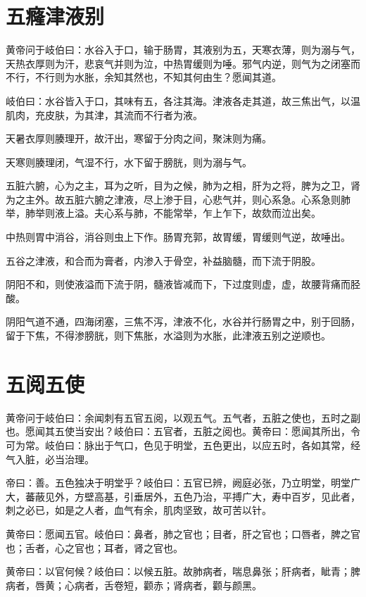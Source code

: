 \documentclass[a4paper,12pt,UTF8,twoside]{ctexbook}
\begin{document}
	\chapter{五癃津液别}
	
	黄帝问于岐伯曰：水谷入于口，输于肠胃，其液别为五，天寒衣薄，则为溺与气，天热衣厚则为汗，悲哀气并则为泣，中热胃缓则为唾。邪气内逆，则气为之闭塞而不行，不行则为水胀，余知其然也，不知其何由生？愿闻其道。
	
	岐伯曰：水谷皆入于口，其味有五，各注其海。津液各走其道，故三焦出气，以温肌肉，充皮肤，为其津，其流而不行者为液。
	
	天暑衣厚则腠理开，故汗出，寒留于分肉之间，聚沫则为痛。
	
	天寒则腠理闭，气湿不行，水下留于膀胱，则为溺与气。
	
	五脏六腑，心为之主，耳为之听，目为之候，肺为之相，肝为之将，脾为之卫，肾为之主外。故五脏六腑之津液，尽上渗于目，心悲气并，则心系急。心系急则肺举，肺举则液上溢。夫心系与肺，不能常举，乍上乍下，故欬而泣出矣。
	
	中热则胃中消谷，消谷则虫上下作。肠胃充郭，故胃缓，胃缓则气逆，故唾出。
	
	五谷之津液，和合而为膏者，内渗入于骨空，补益脑髓，而下流于阴股。
	
	阴阳不和，则使液溢而下流于阴，髓液皆减而下，下过度则虚，虚，故腰背痛而胫酸。
	
	阴阳气道不通，四海闭塞，三焦不泻，津液不化，水谷并行肠胃之中，别于回肠，留于下焦，不得渗膀胱，则下焦胀，水溢则为水胀，此津液五别之逆顺也。
	\chapter{五阅五使}
	
	黄帝问于岐伯曰：余闻刺有五官五阅，以观五气。五气者，五脏之使也，五时之副也。愿闻其五使当安出？岐伯曰：五官者，五脏之阅也。黄帝曰：愿闻其所出，令可为常。岐伯曰：脉出于气口，色见于明堂，五色更出，以应五时，各如其常，经气入脏，必当治理。
	
	帝曰：善。五色独决于明堂乎？岐伯曰：五官已辨，阙庭必张，乃立明堂，明堂广大，蕃蔽见外，方壁高基，引垂居外，五色乃治，平搏广大，寿中百岁，见此者，刺之必已，如是之人者，血气有余，肌肉坚致，故可苦以针。
	
	黄帝曰：愿闻五官。岐伯曰：鼻者，肺之官也；目者，肝之官也；口唇者，脾之官也；舌者，心之官也；耳者，肾之官也。
	
	黄帝曰：以官何候？岐伯曰：以候五脏。故肺病者，喘息鼻张；肝病者，眦青；脾病者，唇黄；心病者，舌卷短，颧赤；肾病者，颧与颜黑。
	
\end{document}
